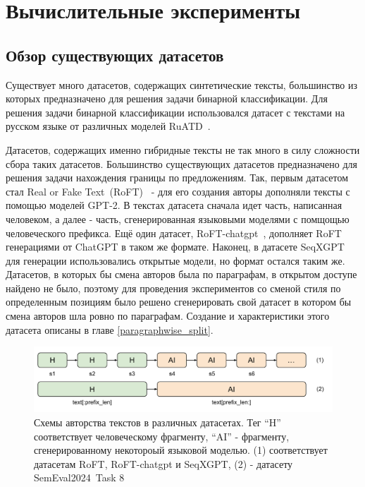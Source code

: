 \section{Вычислительные эксперименты}

\subsection{Обзор существующих датасетов}
\label{dataset}
Существует много датасетов, содержащих синтетические тексты, большинство из которых предназначено  для решения задачи бинарной классификации. Для решения задачи бинарной классификации использовался датасет 
с текстами на русском языке от различных моделей RuATD~\cite{ruatd}.

Датасетов, содержащих именно гибридные тексты не так много в силу сложности сбора таких датасетов. Большинство существующих  датасетов предназначено для решения задачи нахождения границы по предложениям. Так, первым датасетом стал Real or Fake Text~(RoFT)~\cite{dugan-etal-2020-roft} - для его создания авторы дополняли тексты с помощью моделей GPT-2. В текстах датасета сначала идет часть, написанная человеком, а далее - часть, сгенерированная языковыми моделями с помщощью человеческого префикса. Ещё один датасет, RoFT-chatgpt~\cite{kushnareva2024aigenerated}, дополняет RoFT генерациями от ChatGPT в таком же формате. Наконец, в датасете SeqXGPT~\cite{wang-etal-2023-seqxgpt} для генерации использовались открытые модели, но формат остался таким же.
Датасетов, в которых бы смена авторов была по параграфам, в открытом доступе найдено не было, поэтому для проведения экспериментов со сменой стиля по определенным позициям было решено сгенерировать свой датасет в котором бы смена авторов шла ровно по параграфам. Создание и характеристики этого датасета описаны в главе \ref{paragraphwise_split}.

\begin{figure}[h] %
\centering
\includegraphics[width=\linewidth]{images/dataset_schemes.pdf}
\caption{Схемы авторства текстов в различных датасетах. Тег ``H'' соответствует человеческому фрагменту, ``AI'' - фрагменту, сгенерированному некотороый языковой моделью. (1) соответствует датасетам RoFT, RoFT-chatgpt и SeqXGPT, (2) - датасету SemEval2024~Task 8}
\label{schemes}
\end{figure}

